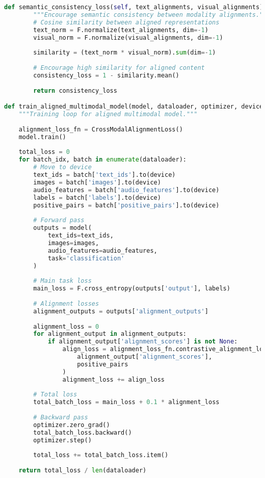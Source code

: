 \begin{lstlisting}[language=Python, caption=Cross-modal alignment training objectives]
    def semantic_consistency_loss(self, text_alignments, visual_alignments):
        """Encourage semantic consistency between modality alignments."""
        # Cosine similarity between aligned representations
        text_norm = F.normalize(text_alignments, dim=-1)
        visual_norm = F.normalize(visual_alignments, dim=-1)
        
        similarity = (text_norm * visual_norm).sum(dim=-1)
        
        # Encourage high similarity for aligned content
        consistency_loss = 1 - similarity.mean()
        
        return consistency_loss

def train_aligned_multimodal_model(model, dataloader, optimizer, device):
    """Training loop for aligned multimodal model."""
    
    alignment_loss_fn = CrossModalAlignmentLoss()
    model.train()
    
    total_loss = 0
    for batch_idx, batch in enumerate(dataloader):
        # Move to device
        text_ids = batch['text_ids'].to(device)
        images = batch['images'].to(device)
        audio_features = batch['audio_features'].to(device)
        labels = batch['labels'].to(device)
        positive_pairs = batch['positive_pairs'].to(device)
        
        # Forward pass
        outputs = model(
            text_ids=text_ids,
            images=images,
            audio_features=audio_features,
            task='classification'
        )
        
        # Main task loss
        main_loss = F.cross_entropy(outputs['output'], labels)
        
        # Alignment losses
        alignment_outputs = outputs['alignment_outputs']
        
        alignment_loss = 0
        for alignment_output in alignment_outputs:
            if alignment_output['alignment_scores'] is not None:
                align_loss = alignment_loss_fn.contrastive_alignment_loss(
                    alignment_output['alignment_scores'],
                    positive_pairs
                )
                alignment_loss += align_loss
        
        # Total loss
        total_batch_loss = main_loss + 0.1 * alignment_loss
        
        # Backward pass
        optimizer.zero_grad()
        total_batch_loss.backward()
        optimizer.step()
        
        total_loss += total_batch_loss.item()
    
    return total_loss / len(dataloader)
\end{lstlisting}

